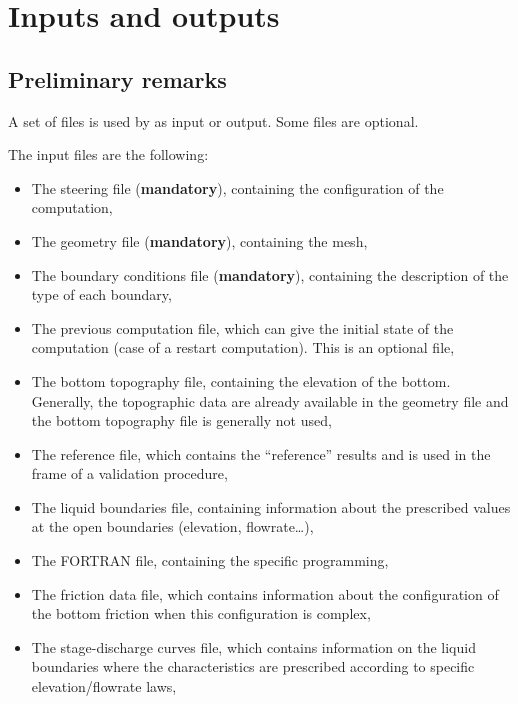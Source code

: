 \chapter{Inputs and outputs}
\label{ch:inp:outp}

\section{Preliminary remarks}

A set of files is used by  as input or output.
Some files are optional.

The input files are the following:

\begin{itemize}
\item The steering file (\textbf{mandatory}), containing the configuration
of the computation,

\item The geometry file (\textbf{mandatory}), containing the mesh,

\item The boundary conditions file (\textbf{mandatory}), containing the
description of the type of each boundary,

\item The previous computation file, which can give the initial state of the
computation (case of a restart computation).
This is an optional file,

\item The bottom topography file, containing the elevation of the bottom.
Generally, the topographic data are already available in the
geometry file and the bottom topography file is generally not used,

\item The reference file, which contains the ``reference'' results
and is used in the frame of a validation procedure,

\item The liquid boundaries file, containing information about the prescribed
values at the open boundaries (elevation, flowrate\dots),

\item The FORTRAN file, containing the specific programming,

\item The friction data file, which contains information about the
configuration of the bottom friction when this configuration is complex,

\item The stage-discharge curves file, which contains information on the liquid
boundaries where the characteristics are prescribed according to specific
elevation/flowrate laws,


\end{itemize}
